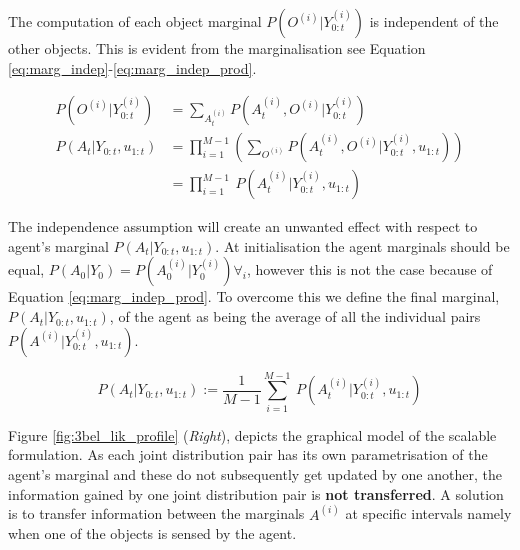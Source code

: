 The computation of each object marginal $P(O^{(i)}|Y^{(i)}_{0:t})$ is independent of the other objects. This is evident from the marginalisation 
see Equation \ref{eq:marg_indep}-\ref{eq:marg_indep_prod}.

\begin{align}
 P(O^{(i)}|Y^{(i)}_{0:t}) &= \sum\limits_{A^{(i)}_t} P(A^{(i)}_t,O^{(i)}|Y^{(i)}_{0:t}) \label{eq:marg_indep} \\
 P(A_t|Y_{0:t},u_{1:t})           &= \prod\limits_{i=1}^{M-1} \left(\sum\limits_{O^{(i)}} P(A^{(i)}_t,O^{(i)}|Y^{(i)}_{0:t},u_{1:t})\right)  \\
	                  &= \prod\limits_{i=1}^{M-1} \ P(A^{(i)}_t|Y^{(i)}_{0:t},u_{1:t}) \label{eq:marg_indep_prod}
\end{align}

The independence assumption will create an unwanted effect with respect to agent's marginal $P(A_t|Y_{0:t},u_{1:t})$. 
At initialisation the agent marginals should be equal, $P(A_0|Y_0) = P(A^{(i)}_0|Y^{(i)}_0) \forall_i$, however this is not the case because of 
Equation \ref{eq:marg_indep_prod}. To overcome this we define the final marginal, $P(A_t|Y_{0:t},u_{1:t})$, of the agent as being the average of all the individual
pairs $P(A^{(i)}|Y^{(i)}_{0:t},u_{1:t})$.

\begin{equation}
  P(A_t|Y_{0:t},u_{1:t}) := \frac{1}{M-1} \sum\limits_{i=1}^{M-1} \ P(A^{(i)}_t|Y^{(i)}_{0:t},u_{1:t}) \label{eq:marg_indep_sum}
\end{equation}

Figure \ref{fig:3bel_lik_profile} (\textit{Right}), depicts the graphical model of the scalable formulation. 
As each joint distribution pair has its own parametrisation of the agent's marginal and these do not subsequently get updated by one another,
the information gained by one joint distribution pair is \textbf{not transferred}.
A solution is to transfer information between the marginals $A^{(i)}$ at specific intervals namely when one of the objects is sensed by the agent. 

